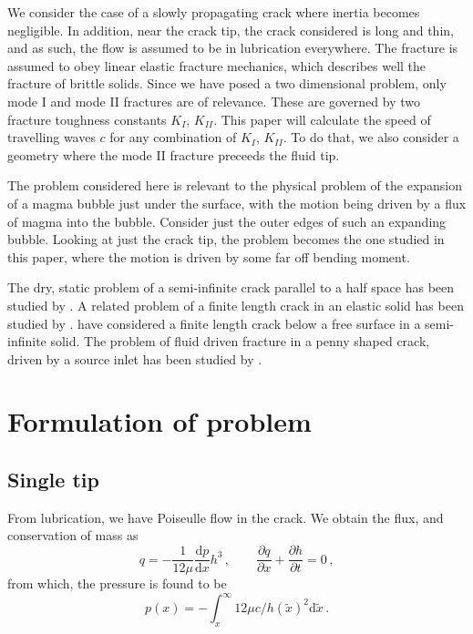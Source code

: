 \documentclass{jfm}
\newcommand{\mrd}{\mathrm{d}}
\begin{document}
We consider the case of a slowly propagating crack where inertia becomes
negligible. In addition, near the crack tip, the crack considered is 
long and thin, and as such, the flow is assumed to be in lubrication 
everywhere. The fracture is assumed to obey linear elastic fracture mechanics, 
which describes well the fracture of brittle solids. Since we have posed a two 
dimensional problem, only mode I and mode II fractures are of relevance. These 
are governed by two fracture toughness constants $K_I$, $K_{II}$. This paper 
will calculate the speed of travelling waves $c$ for any combination of $K_I$, 
$K_{II}$. To do that, we also consider a geometry where the mode II fracture 
preceeds the fluid tip. 

The problem considered here is relevant to the physical problem of the 
expansion of a magma bubble just under the surface, 
with the motion being driven by a flux of magma into the bubble.
Consider just the outer edges of such an expanding bubble. Looking at just
the crack tip, the problem becomes the one studied in this paper, where the
motion is driven by some far off bending moment.

The dry, static problem of a semi-infinite crack parallel to a half space has been
studied by \citet{Zlatin}. A related problem of a finite length crack
in an elastic solid has been studied by \citet{Thouless}. \citet{Dyskin}
have considered a finite length crack below a free surface in a semi-infinite 
solid. The problem of fluid driven fracture in a penny shaped crack, driven by
a source inlet has been studied by \citet{Garagash}.

%
% 
\section{Formulation of problem}\label{sec:formulation_of_problem}
%
%
\subsection{Single tip}
From lubrication, we have Poiseulle flow in the crack. We obtain
the flux, and conservation of mass as 
\begin{equation}
q = - \frac{1}{12\mu}\frac{\mrd p}{\mrd x}h^3 \, , \qquad
\frac{\partial q}{\partial x} + \frac{\partial h}{\partial t} = 0 \, ,
\end{equation}
from which, the pressure is found to be
\begin{equation}
p(x) = -\int_x^{\infty} 12\mu c / h(\tilde{x})^2 \mrd \tilde{x} \, .
\end{equation}
\end{document}
